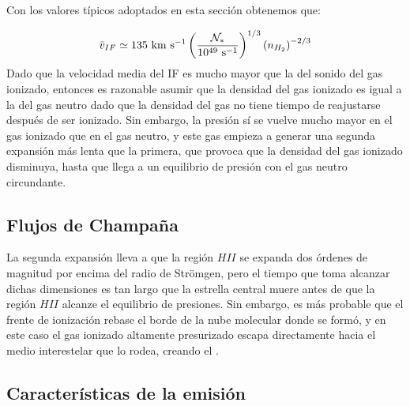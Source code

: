 Con los valores típicos adoptados en esta sección obtenemos que:

\begin{align}
  \bar{v}_{IF}\simeq 135\mathrm{~km~s^{-1}}\left(\frac{\mathcal{N}_*}{10^{49}\mathrm{~s^{-1}}}\right)^{1/3}\left(n_{H_2}\right)^{-2/3}
\end{align}
Dado que la velocidad media del IF es mucho mayor que la del sonido del gas ionizado, entonces es razonable asumir que la densidad del gas ionizado es igual a la del gas neutro dado que la densidad del gas no tiene tiempo de reajustarse después de ser ionizado. Sin embargo, la presión sí se vuelve mucho mayor en el gas ionizado que en el gas neutro, y este gas empieza a generar una segunda expansión más lenta que la primera, que provoca que la densidad del gas ionizado disminuya, hasta que llega a un equilibrio de presión con el gas neutro circundante.
\subsection{Flujos de Champaña}

La segunda expansión lleva a que la región $HII$ se expanda dos órdenes de magnitud por encima del radio de Strömgen, pero el tiempo que toma alcanzar dichas dimensiones es tan largo que la estrella central muere antes de que la región $HII$ alcanze el equilibrio de presiones. Sin embargo, es más probable que el frente de ionización rebase el borde de la nube molecular donde se formó, y en este caso el gas ionizado altamente presurizado escapa directamente hacia el medio interestelar que lo rodea, creando el .

\subsection{Características de la emisión}


